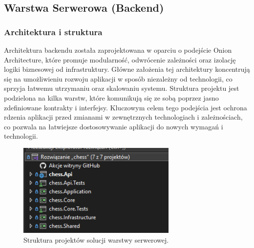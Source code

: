 \documentclass[12pt,a4paper]{article}
\begin{document}
\newpage

\subsection{Warstwa Serwerowa (Backend)} 

\subsubsection{Architektura i struktura} 

\noindent
Architektura backendu została zaprojektowana w oparciu o podejście Onion Architecture, które promuje modularność, odwrócenie zależności oraz izolację logiki biznesowej od infrastruktury. Główne założenia tej architektury koncentrują się na umożliwieniu rozwoju aplikacji w sposób niezależny od technologii, co sprzyja łatwemu utrzymaniu oraz skalowaniu systemu. Struktura projektu jest podzielona na kilka warstw, które komunikują się ze sobą poprzez jasno zdefiniowane kontrakty i interfejsy. Kluczowym celem tego podejścia jest ochrona rdzenia aplikacji przed zmianami w zewnętrznych technologiach i zależnościach, co pozwala na łatwiejsze dostosowywanie aplikacji do nowych wymagań i technologii.

\vspace{0.5cm}
\begin{figure}[h!] 
    \centering 
    \includegraphics[width=0.7\textwidth]{images/struktura_back.png} 
    \caption{Struktura projektów solucji warstwy serwerowej.} 
\end{figure}
\vspace{0.5cm}
\end{document}
